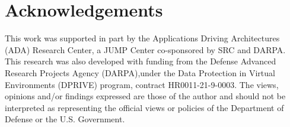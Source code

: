 \documentclass{article}
\begin{document}






%



\section*{Acknowledgements}
This work was supported in part by the Applications Driving Architectures (ADA) Research Center, a JUMP Center co-sponsored by SRC and DARPA.
This research was also developed with funding from the Defense Advanced Research Projects Agency (DARPA),under the Data Protection in Virtual Environments (DPRIVE) program, contract HR0011-21-9-0003.
The views, opinions and/or findings expressed are those of the author and should not be interpreted as representing the official views or policies of the Department of Defense or the U.S. Government.






\nocite{langley00}





\newpage
\appendix
\clearpage


%
\end{document}
